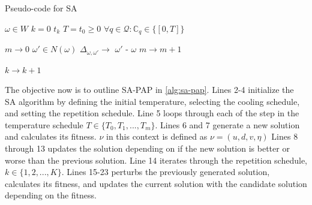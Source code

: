 \documentclass[ee,msthesis]{usuthesis}
\newcommand{\Tau}{T}                        %
\newcommand{\C}{\mathbb{C}}                 %
\newcommand{\Qset}{\mathcal{Q}}             %
\begin{document}
\begin{algorithm}[H]
\caption{Pseudo-code for SA} \label{alg:sa-pseudo}
    \LinesNumbered

    \Begin
    {
        $\omega \in W$ 
        $k=0$ 
        $t_k$ 
        $T = t_0 \geq 0$ 
        $\forall q \in \Qset : \C_q \in \{[0,T]\}$ 

        {
            $m \rightarrow 0$ 
            {
                $\omega' \in N(\omega)$ 
                $\Delta_{\omega,\omega'} \rightarrow$ \f{$\omega'$} - \f{$\omega$} 
                $m \rightarrow m+1$\;
            }

        $k \rightarrow k+1$\;
        }
    }
\end{algorithm}

The objective now is to outline SA-PAP in \ref{alg:sa-pap}. Lines 2-4 initialize the SA algorithm by defining the initial
temperature, selecting the cooling schedule, and setting the repetition schedule. Line 5 loops through each of the step
in the temperature schedule \(\Tau \in \{ \Tau_0, \Tau_1, ..., \Tau_m \}\). Lines 6 and 7 generate a new solution and
calculates its fitness. \(\nu\) in this context is defined as \(\nu = (u, d, v, \eta)\) Lines 8 through 13 updates the solution
depending on if the new solution is better or worse than the previous solution. Line 14 iterates through the repetition
schedule, \(k \in \{1, 2, ..., K\}\). Lines 15-23 perturbs the previously generated solution, calculates its fitness, and
updates the current solution with the candidate solution depending on the fitness.
\end{document}
